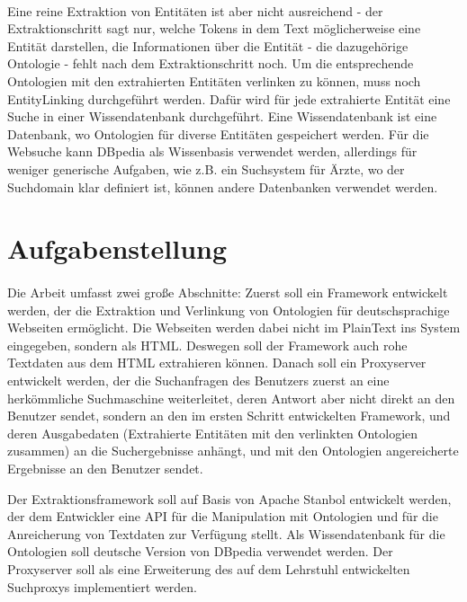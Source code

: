 \paragraph{}
Eine reine Extraktion von Entitäten ist aber nicht ausreichend - der Extraktionschritt sagt nur, welche Tokens in dem Text möglicherweise eine Entität darstellen, die Informationen über die Entität - die dazugehörige Ontologie - fehlt nach dem Extraktionschritt noch. Um die entsprechende Ontologien mit den extrahierten Entitäten verlinken zu können, muss noch EntityLinking durchgeführt werden. Dafür wird für jede extrahierte Entität eine Suche in einer Wissendatenbank durchgeführt. Eine Wissendatenbank ist eine Datenbank, wo Ontologien für diverse Entitäten gespeichert werden. Für die Websuche kann DBpedia als Wissenbasis verwendet werden, allerdings für weniger generische Aufgaben, wie z.B. ein Suchsystem für Ärzte, wo der Suchdomain klar definiert ist, können andere Datenbanken verwendet werden.

\section{Aufgabenstellung}
\label{sec:Aufgabenstellung}
\paragraph{}
Die Arbeit umfasst zwei große Abschnitte: Zuerst soll ein Framework entwickelt werden, der die Extraktion und Verlinkung von Ontologien für deutschsprachige Webseiten ermöglicht. Die Webseiten werden dabei nicht im PlainText ins System eingegeben, sondern als HTML. Deswegen soll der Framework auch rohe Textdaten aus dem HTML extrahieren können. Danach soll ein Proxyserver  entwickelt werden, der die Suchanfragen des Benutzers zuerst an eine herkömmliche Suchmaschine weiterleitet, deren Antwort aber nicht direkt an den Benutzer sendet, sondern an den im ersten Schritt entwickelten Framework, und deren Ausgabedaten (Extrahierte Entitäten mit den verlinkten Ontologien zusammen) an die Suchergebnisse anhängt, und mit den Ontologien angereicherte Ergebnisse an den Benutzer sendet.

Der Extraktionsframework soll auf Basis von Apache Stanbol entwickelt werden, der dem Entwickler eine API für die Manipulation mit Ontologien und für die Anreicherung von Textdaten zur Verfügung stellt. Als Wissendatenbank für die Ontologien soll deutsche Version von DBpedia verwendet werden. Der Proxyserver soll als eine Erweiterung des auf dem Lehrstuhl entwickelten Suchproxys implementiert werden.

